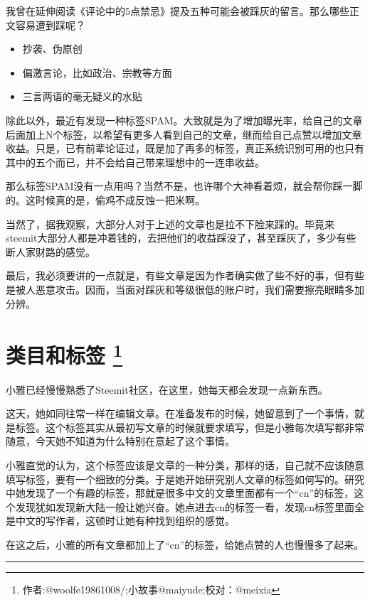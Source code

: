 \documentclass[]{ctexbook}
\providecommand{\tightlist}{%
  \setlength{\itemsep}{0pt}\setlength{\parskip}{0pt}}
\begin{document}
我曾在延伸阅读《评论中的5点禁忌》提及五种可能会被踩灰的留言。那么哪些正文容易遭到踩呢？

\begin{itemize}
\tightlist
\item
  抄袭、伪原创
\item
  偏激言论，比如政治、宗教等方面
\item
  三言两语的毫无疑义的水贴
\end{itemize}

除此以外，最近有发现一种标签SPAM。大致就是为了增加曝光率，给自己的文章后面加上N个标签，以希望有更多人看到自己的文章，继而给自己点赞以增加文章收益。只是，已有前辈论证过，既是加了再多的标签，真正系统识别可用的也只有其中的五个而已，并不会给自己带来理想中的一连串收益。

那么标签SPAM没有一点用吗？当然不是，也许哪个大神看着烦，就会帮你踩一脚的。这时候真的是，偷鸡不成反蚀一把米啊。

当然了，据我观察，大部分人对于上述的文章也是拉不下脸来踩的。毕竟来steemit大部分人都是冲着钱的，去把他们的收益踩没了，甚至踩灰了，多少有些断人家财路的感觉。

最后，我必须要讲的一点就是，有些文章是因为作者确实做了些不好的事，但有些是被人恶意攻击。因而，当面对踩灰和等级很低的账户时，我们需要擦亮眼睛多加分辨。

\hypertarget{lmhbq}{%
\section[类目和标签 ]{\texorpdfstring{类目和标签 \footnote{作者:@woolfe19861008/;小故事@maiyude;校对：@meixia}}{类目和标签 }}\label{lmhbq}}

小雅已经慢慢熟悉了Steemit社区，在这里，她每天都会发现一点新东西。

这天，她如同往常一样在编辑文章。在准备发布的时候，她留意到了一个事情，就是标签。这个标签其实从最初写文章的时候就要求填写，但是小雅每次填写都非常随意，今天她不知道为什么特别在意起了这个事情。

小雅直觉的认为，这个标签应该是文章的一种分类，那样的话，自己就不应该随意填写标签，要有一个细致的分类。于是她开始研究别人文章的标签如何写的。研究中她发现了一个有趣的标签，那就是很多中文的文章里面都有一个``cn''的标签，这个发现犹如发现新大陆一般让她兴奋。她点进去cn的标签一看，发现cn标签里面全是中文的写作者，这顿时让她有种找到组织的感觉。

在这之后，小雅的所有文章都加上了``cn''的标签，给她点赞的人也慢慢多了起来。

\begin{center}\rule{0.5\linewidth}{\linethickness}\end{center}
\end{document}
